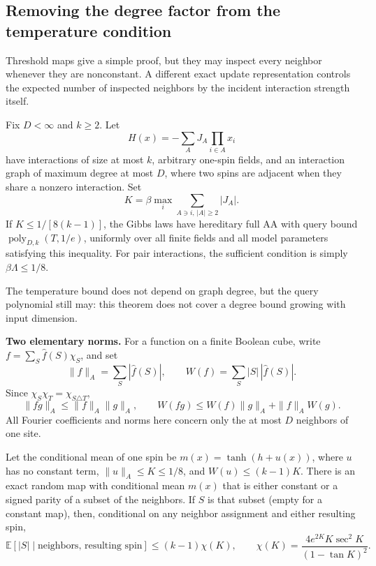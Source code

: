\subsection{Removing the degree factor from the temperature condition}
\label{resolution-dynamics:weighted-maps}

Threshold maps give a simple proof, but they may inspect every neighbor
whenever they are nonconstant. A different exact update representation
controls the expected number of inspected neighbors by the incident
interaction strength itself.

\begin{theorem}
\label{thm:resolution-dynamics-weighted}
Fix \(D<\infty\) and \(k\ge2\). Let
\[
 H(x)=-\sum_A J_A\prod_{i\in A}x_i
\]
have interactions of size at most \(k\), arbitrary one-spin fields,
and an interaction graph of maximum degree at most \(D\), where two
spins are adjacent when they share a nonzero interaction. Set
\[
 K=\beta\max_i\sum_{A\ni i,\,|A|\ge2}|J_A|.
\]
If \(K\le1/[8(k-1)]\), the Gibbs laws have hereditary full AA with
query bound \(\operatorname{poly}_{D,k}(T,1/e)\), uniformly over all
finite fields and all model parameters satisfying this inequality.
For pair interactions, the sufficient condition is simply
\(\beta\Lambda\le1/8\).
\end{theorem}

The temperature bound does not depend on graph degree, but the query
polynomial still may: this theorem does not cover a degree bound growing
with input dimension.

\textbf{Two elementary norms.}
For a function on a finite Boolean cube, write
\(f=\sum_S\widehat f(S)\chi_S\), and set
\[
 \|f\|_A=\sum_S|\widehat f(S)|,\qquad
 W(f)=\sum_S|S|\,|\widehat f(S)|.
\]
Since \(\chi_S\chi_T=\chi_{S\triangle T}\),
\[
 \|fg\|_A\le\|f\|_A\|g\|_A,\qquad
 W(fg)\le W(f)\|g\|_A+\|f\|_AW(g).
 \tag{WA}
\]
All Fourier coefficients and norms here concern only the at most
\(D\) neighbors of one site.

\begin{lemma}
\label{lem:resolution-dynamics-parity-law}
Let the conditional mean of one spin be
\(m(x)=\tanh(h+u(x))\), where
\(u\) has no constant term,
\(\|u\|_A\le K\le1/8\), and
\(W(u)\le(k-1)K\). There is an exact random map with conditional
mean \(m(x)\) that is either constant or a signed parity of a subset
of the neighbors. If \(S\) is that subset (empty for a constant map),
then, conditional on any neighbor assignment and either resulting spin,
\[
 \mathbb E[|S|\mid\text{neighbors, resulting spin}]
 \le (k-1)\chi(K),\qquad
 \chi(K)=\frac{4e^{2K}K\sec^2K}{(1-\tan K)^2}.
 \tag{PS}
\]
\end{lemma}

